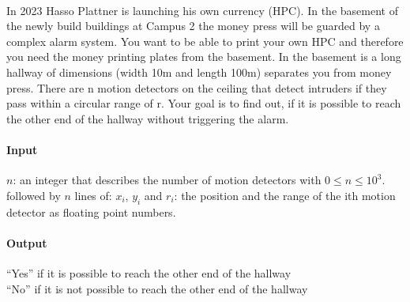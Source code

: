 



\makeheader

\\
In 2023 Hasso Plattner is launching his own currency (HPC). In the basement of the newly build buildings at Campus 2 the money press will be guarded by a complex alarm system. 
You want to be able to print your own HPC and therefore you need the money printing plates from the basement. 
In the basement is a long hallway of dimensions (width 10m and length 100m) separates you from money press. There are n motion detectors on the ceiling that detect intruders if they pass within a circular range of r. 
Your goal is to find out, if it is possible to reach the other end of the hallway without triggering the alarm. 

\paragraph*{Input}
$n$: an integer that describes the number of motion detectors with $0 \leq n \leq 10^3$.\\
followed by $n$ lines of:
$x_i$, $y_i$ and $r_i$: the position and the range of the ith motion detector as floating point numbers. 


\paragraph*{Output}
“Yes” if it is possible to reach the other end of the hallway \\
“No” if it is not possible to reach the other end of the hallway


\begin{samples}
\end{samples}



